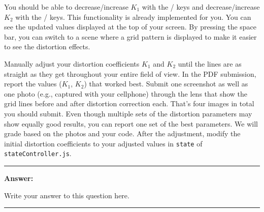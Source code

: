 \documentclass[conference]{styles/acmsiggraph}
\newenvironment{answer}{}{}
\begin{document}
You should be able to decrease/increase $K_1$ with the / keys and decrease/increase $K_2$ with the / keys. This functionality is already implemented for you. You can see the updated values displayed at the top of your screen. By pressing the space bar, you can switch to a scene where a grid pattern is displayed to make it easier to see the distortion effects.


Manually adjust your distortion coefficients $K_1$ and $K_2$ until the lines are as straight as they get throughout your entire field of view. In the PDF submission, report the values ($K_1$, $K_2$) that worked best. Submit one screenshot as well as one photo (e.g., captured with your cellphone) through the lens that show the grid lines before and after distortion correction each. That's four images in total you should submit. Even though multiple sets of the distortion parameters may show equally good results, you can report one set of the best parameters. We will grade based on the photos and your code. After the adjustment, modify the initial distortion coefficients to your adjusted values in \texttt{state} of \texttt{stateController.js}.

\begin{answer}
\rule{\textwidth}{0.4pt}
	
	\textbf{Answer:}
	
	Write your answer to this question here.

\rule{\textwidth}{0.4pt}
\end{answer}
\end{document}
